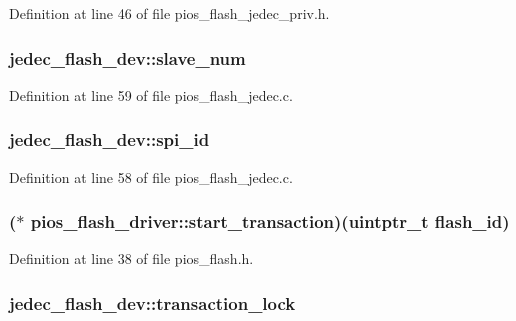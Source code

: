 Definition at line 46 of file pios\-\_\-flash\-\_\-jedec\-\_\-priv.\-h.

\hypertarget{group___p_i_o_s___f_l_a_s_h_ga38ca35aafe78e6032326184768221fab}{
\subsubsection[{slave\-\_\-num}]{ jedec\-\_\-flash\-\_\-dev\-::slave\-\_\-num}}\label{group___p_i_o_s___f_l_a_s_h_ga38ca35aafe78e6032326184768221fab}


Definition at line 59 of file pios\-\_\-flash\-\_\-jedec.\-c.

\hypertarget{group___p_i_o_s___f_l_a_s_h_ga0f87de9cf831cf45ad2e81d4629cf021}{
\subsubsection[{spi\-\_\-id}]{ jedec\-\_\-flash\-\_\-dev\-::spi\-\_\-id}}\label{group___p_i_o_s___f_l_a_s_h_ga0f87de9cf831cf45ad2e81d4629cf021}


Definition at line 58 of file pios\-\_\-flash\-\_\-jedec.\-c.

\hypertarget{group___p_i_o_s___f_l_a_s_h_ga3128721bfc5d4b157f9c8866d10d80f0}{
\subsubsection[{start\-\_\-transaction}]{($\ast$ pios\-\_\-flash\-\_\-driver\-::start\-\_\-transaction)(uintptr\-\_\-t flash\-\_\-id)}}\label{group___p_i_o_s___f_l_a_s_h_ga3128721bfc5d4b157f9c8866d10d80f0}


Definition at line 38 of file pios\-\_\-flash.\-h.

\hypertarget{group___p_i_o_s___f_l_a_s_h_ga28870637f7372faa2a3fb2bd887a4ab7}{
\subsubsection[{transaction\-\_\-lock}]{ jedec\-\_\-flash\-\_\-dev\-::transaction\-\_\-lock}}\label{group___p_i_o_s___f_l_a_s_h_ga28870637f7372faa2a3fb2bd887a4ab7}


